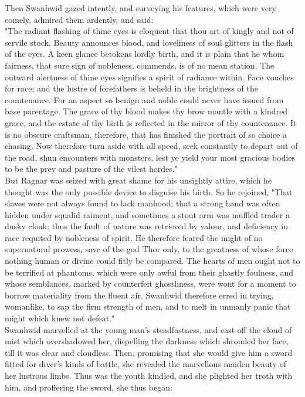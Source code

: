 \documentclass[10pt,a4paper]{report}
\begin{document}
Then Swanhwid gazed intently, and surveying his features, which were very comely, admired them ardently, and said:\\

"The radiant flashing of thine eyes is eloquent that thou art of kingly and not of servile stock. Beauty announces blood, and loveliness of soul glitters in the flash of the eyes. A keen glance betokens lordly birth, and it is plain that he whom fairness, that sure sign of nobleness, commends, is of no mean station. The outward alertness of thine eyes signifies a spirit of radiance within. Face vouches for race; and the lustre of forefathers is beheld in the brightness of the countenance. For an aspect so benign and noble could never have issued from base parentage. The grace of thy blood makes thy brow mantle with a kindred grace, and the estate of thy birth is reflected in the mirror of thy countenance. It is no obscure craftsman, therefore, that has finished the portrait of so choice a chasing. Now therefore turn aside with all speed, seek constantly to depart out of the road, shun encounters with monsters, lest ye yield your most gracious bodies to be the prey and pasture of the vilest hordes."\\

But Ragnar was seized with great shame for his unsightly attire, which he thought was the only possible device to disguise his birth. So he rejoined, "That slaves were not always found to lack manhood; that a strong hand was often hidden under squalid raiment, and sometimes a stout arm was muffled trader a dusky cloak; thus the fault of nature was retrieved by valour, and deficiency in race requited by nobleness of spirit. He therefore feared the might of no supernatural prowess, save of the god Thor only, to the greatness of whose force nothing human or divine could fitly be compared. The hearts of men ought not to be terrified at phantoms, which were only awful from their ghastly foulness, and whose semblances, marked by counterfeit ghostliness, were wont for a moment to borrow materiality from the fluent air. Swanhwid therefore erred in trying, womanlike, to sap the firm strength of men, and to melt in unmanly panic that might which knew not defeat."\\

Swanhwid marvelled at the young man's steadfastness, and cast off the cloud of mist which overshadowed her, dispelling the darkness which shrouded her face, till it was clear and cloudless. Then, promising that she would give him a sword fitted for diver's kinds of battle, she revealed the marvellous maiden beauty of her lustrous limbs. Thus was the youth kindled, and she plighted her troth with him, and proffering the sword, she thus began:\\
\end{document}
